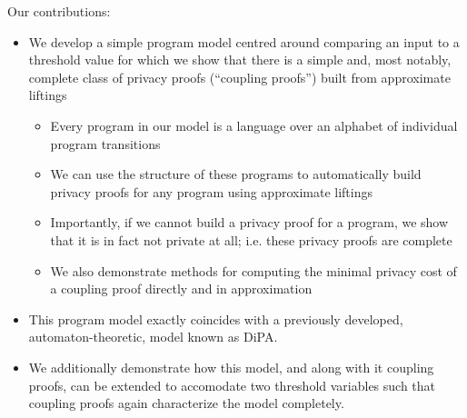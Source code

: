 Our contributions:
\begin{itemize}
    \item We develop a simple program model centred around comparing an input to a threshold value for which we show that there is a simple and, most notably, complete class of privacy proofs (``coupling proofs'') built from approximate liftings
    \begin{itemize}
        \item Every program in our model is a language over an alphabet of individual program transitions
        \item We can use the structure of these programs to automatically build privacy proofs for any program using approximate liftings
        \item Importantly, if we cannot build a privacy proof for a program, we show that it is in fact not private at all; i.e. these privacy proofs are complete
        \item We also demonstrate methods for computing the minimal privacy cost of a coupling proof directly and in approximation
    \end{itemize}
    \item This program model exactly coincides with a previously developed, automaton-theoretic, model known as DiPA. 
    \item We additionally demonstrate how this model, and along with it coupling proofs, can be extended to accomodate two threshold variables such that coupling proofs again characterize the model completely. 
\end{itemize}